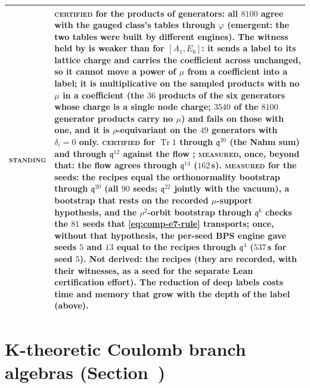 \documentclass[11pt]{amsart}
\makeatletter
\DeclareMathOperator{\Tr}{Tr}
\newcommand\fq{\mathfrak{q}}
\theoremstyle{remark}
\newcommand{\pref}[1]{\@ifundefined{r@P-#1}{\textup{[\texttt{\detokenize{#1}}]}}{\ref{P-#1}}}
\newcommand{\CERTIFIED}{\textsc{certified}}
\newcommand{\MEASURED}{\textsc{measured}}
\newenvironment{machinery}{%
  \leavevmode\par\medskip\noindent
  \begin{tabular}{@{}>{\scshape}p{2.1cm}>{\raggedright\arraybackslash}p{\dimexpr\linewidth-2.5cm\relax}@{}}\toprule}%
  {\bottomrule\end{tabular}\par\medskip}
\makeatother
\begin{document}
\begin{machinery}
standing & \CERTIFIED{} for the products of generators: all $8100$ agree with the gauged class's tables through $\varphi$ (emergent: the two tables were built by different engines).  The witness held by \code{kalgebra_object("e7")} is weaker than for $[A_1,E_6]$: it sends a label to its lattice charge and carries the coefficient across unchanged, so it cannot move a power of $\mu$ from a coefficient into a label; it is multiplicative on the sampled products with no $\mu$ in a coefficient (the $36$ products of the six generators whose charge is a single node charge; $3540$ of the $8100$ generator products carry no $\mu$) and fails on those with one, and it is $\rho$-equivariant on the $49$ generators with $\delta_i=0$ only.  \CERTIFIED{} for $\Tr1$ through $\fq^{20}$ (the Nahm sum) and through $\fq^{12}$ against the flow \code{E7RGKAlgebra}; \MEASURED{}, once, beyond that: the flow agrees through $\fq^{14}$ ($162$\,s).  \MEASURED{} for the seeds: the recipes equal the orthonormality bootstrap through $\fq^{20}$ (all $90$ seeds; $\fq^{22}$ jointly with the vacuum), a bootstrap that rests on the recorded $\mu$-support hypothesis, and the $\rho^2$-orbit bootstrap through $\fq^6$ checks the $81$ seeds that \eqref{eq:comp-e7-rule} transports; once, without that hypothesis, the per-seed BPS engine gave seeds $5$ and $13$ equal to the recipes through $\fq^4$ ($537$\,s for seed $5$).  Not derived: the recipes (they are recorded, with their witnesses, as a seed for the separate Lean certification effort).  The reduction of deep labels costs time and memory that grow with the depth of the label (above). \\
\end{machinery}

\section{K-theoretic Coulomb branch algebras (Section~\pref{sec:coulomb})}\label{sec:coulomb}
\end{document}
